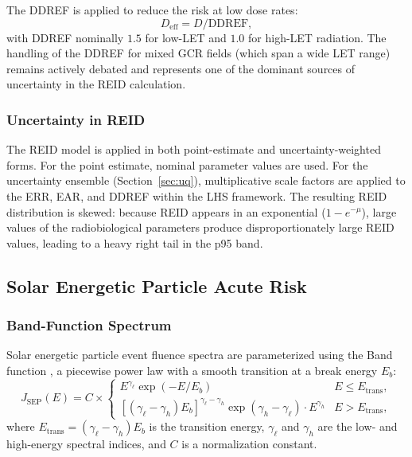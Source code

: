 The DDREF is applied to reduce the risk at low dose rates:
\begin{equation}
  D_\mathrm{eff} = D / \mathrm{DDREF},
  \label{eq:ddref}
\end{equation}
with DDREF nominally $1.5$ for low-LET and $1.0$ for high-LET radiation.
The handling of the DDREF for mixed GCR fields (which span a wide LET range)
remains actively debated \citep{durant2013} and represents one of the
dominant sources of uncertainty in the REID calculation.

\subsubsection{Uncertainty in REID}
\label{sec:reidunc}

The REID model is applied in both point-estimate and uncertainty-weighted forms.
For the point estimate, nominal parameter values are used.
For the uncertainty ensemble (Section~\ref{sec:uq}), multiplicative scale
factors are applied to the ERR, EAR, and DDREF within the
LHS framework.
The resulting REID distribution is skewed: because REID appears in
an exponential ($1 - e^{-\mu}$), large values of the radiobiological
parameters produce disproportionately large REID values, leading to
a heavy right tail in the p95 band.

\subsection{Solar Energetic Particle Acute Risk}
\label{sec:sep}

\subsubsection{Band-Function Spectrum}
\label{sec:band}

Solar energetic particle event fluence spectra are parameterized using the
Band function \citep{tylka2006}, a piecewise power law with a smooth
transition at a break energy $E_b$:
\begin{equation}
  J_\mathrm{SEP}(E) = C \times \begin{cases}
    E^{\gamma_\ell} \exp(-E/E_b) & E \leq E_\mathrm{trans}, \\
    \left[(\gamma_\ell - \gamma_h) E_b\right]^{\gamma_\ell - \gamma_h}
    \exp(\gamma_h - \gamma_\ell) \cdot E^{\gamma_h} & E > E_\mathrm{trans},
  \end{cases}
  \label{eq:band}
\end{equation}
where $E_\mathrm{trans} = (\gamma_\ell - \gamma_h) E_b$ is the transition energy,
$\gamma_\ell$ and $\gamma_h$ are the low- and high-energy spectral indices,
and $C$ is a normalization constant.

